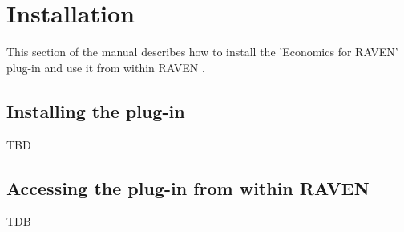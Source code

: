 
\section{Installation}
\label{sec:Installation}

This section of the manual describes how to install the 'Economics for RAVEN'  plug-in and use it from within RAVEN \cite{RAVEN}.

\subsection{Installing the plug-in}
 TBD

\subsection{Accessing the plug-in from within RAVEN}
 TDB
